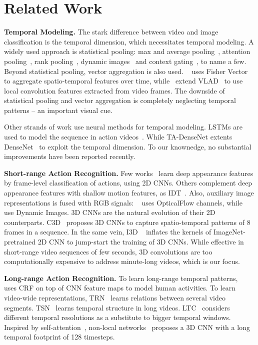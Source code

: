 \documentclass[10pt,twocolumn,letterpaper]{article}
\newcommand{\partitle}[1]{\noindent\textbf{#1}}
\begin{document}
\section{Related Work}\label{sec:related_work}
\partitle{Temporal Modeling.}
The stark difference between video and image classification is the temporal dimension, which necessitates temporal modeling.
A widely used approach is statistical pooling: max and average pooling~\cite{hussein2017unified,habibian2017video2vec}, attention pooling~\cite{girdhar2017attentional}, rank pooling~\cite{fernando2017rank},  dynamic images~\cite{bilen2016dynamic} and context gating~\cite{miech2017learnable}, to name a few.
Beyond statistical pooling, vector aggregation is also used.
~\cite{oneata2013action} uses Fisher Vector~\cite{sanchez2013image} to aggregate spatio-temporal features over time,
while~\cite{girdhar2017actionvlad,cosmin2017spatio,duta2017spatio} extend VLAD~\cite{arandjelovic2013all} to use local convolution features extracted from video frames.
The downside of statistical pooling and vector aggregation is completely neglecting temporal patterns -- an important visual cue.

Other strands of work use neural methods for temporal modeling.
LSTMs are used to model the sequence in action videos~\cite{donahue2015long}.
While TA-DenseNet\cite{ghodrati2018video} extents DenseNet~\cite{huang2017densely} to exploit the temporal dimension.
To our knownedge, no substantial improvements have been reported recently.

\partitle{Short-range Action Recognition.}
Few works~\cite{karpathy2014large} learn deep appearance features by frame-level classification of actions, using 2D CNNs.
Others complement deep appearance features with shallow motion features, as IDT~\cite{feichtenhofer2016convolutional}.
Also, auxiliary image representations is fused with RGB signals:
~\cite{simonyan2014two} uses OpticalFlow channels, while~\cite{bilen2017action} use Dynamic Images.
3D CNNs are the natural evolution of their 2D counterparts.
C3D~\cite{tran2015learning,ji20133d} proposes 3D CNNs to capture spatio-temporal patterns of 8 frames in a sequence.
In the same vein, I3D ~\cite{carreira2017quo} inflates the kernels of ImageNet-pretrained 2D CNN to jump-start the training of 3D CNNs.
While effective in short-range video sequences of few seconds, 3D convolutions are too computationally expensive to address minute-long videos, which is our focus.

\partitle{Long-range Action Recognition.}
To learn long-range temporal patterns, ~\cite{sigurdsson2017asynchronous} uses CRF on top of CNN feature maps to model human activities.
To learn video-wide representations, TRN~\cite{zhou2017temporal} learns relations between several video segments.
TSN~\cite{wang2016temporal,wang2018temporal} learns temporal structure in long videos.
LTC~\cite{varol2017long} considers different temporal resolutions as a substitute to bigger temporal windows.
Inspired by self-attention~\cite{vaswani2017attention}, non-local networks~\cite{wang2017non} proposes a 3D CNN with a long temporal footprint of 128 timesteps.
\end{document}
